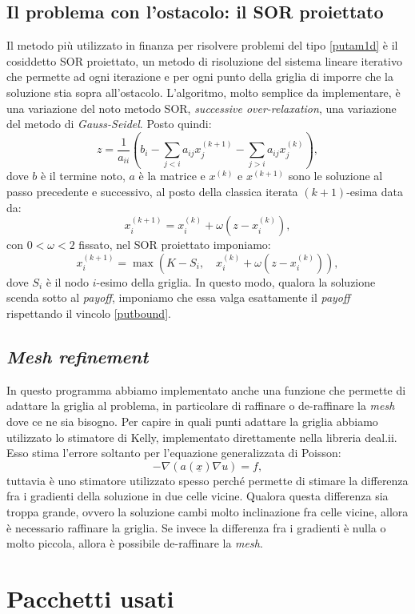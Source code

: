 \documentclass[a4paper,10pt]{report}
\theoremstyle{plain}
\theoremstyle{definition}
\theoremstyle{remark}
\begin{document}
\section{Il problema con l'ostacolo: il SOR proiettato}
Il metodo pi\`u utilizzato in finanza per risolvere problemi del tipo \ref{putam1d}  \`e il cosiddetto SOR proiettato, un metodo di risoluzione del sistema lineare iterativo che permette ad ogni iterazione e per ogni punto della griglia di imporre che la soluzione stia sopra all'ostacolo. L'algoritmo, molto semplice da implementare, \`e una variazione del noto metodo SOR, \emph{successive over-relaxation}, una variazione del metodo di \emph{Gauss-Seidel}. Posto quindi: $$z=\frac{1}{a_{ii}}\left(b_i-\sum_{j<i}a_{ij}x_j^{(k+1)}-\sum_{j>i}a_{ij}x_j^{(k)}\right),$$dove $b$ \`e il termine noto, $a$ \`e la matrice e $x^{(k)}$ e $x^{(k+1)}$ sono le soluzione al passo precedente e successivo, al posto della classica iterata $(k+1)$-esima data da: $$x_i^{(k+1)}=x_i^{(k)}+\omega(z-x_i^{(k)}),$$con $0<\omega<2$ fissato, nel SOR proiettato imponiamo: $$x_i^{(k+1)}=\max\left(K-S_i,\quad x_i^{(k)}+\omega(z-x_i^{(k)})\right),$$dove $S_i$ \`e il nodo $i$-esimo della griglia. In questo modo, qualora la soluzione scenda sotto al \emph{payoff}, imponiamo che essa valga esattamente il \emph{payoff} rispettando il vincolo \ref{putbound}.
\section{\emph{Mesh refinement}}
In questo programma abbiamo implementato anche una funzione che permette di adattare la griglia al problema, in particolare di raffinare o de-raffinare la \emph{mesh} dove ce ne sia bisogno. Per capire in quali punti adattare la griglia abbiamo utilizzato lo stimatore di Kelly, implementato direttamente nella libreria \textsf{deal.ii}. Esso stima l'errore soltanto per l'equazione generalizzata di Poisson: $$-\nabla\left(a(\underline{x})\nabla u\right)=f,$$tuttavia \`e uno stimatore utilizzato spesso perch\'e permette di stimare la differenza fra i gradienti della soluzione in due celle vicine. Qualora questa differenza sia troppa grande, ovvero la soluzione cambi molto inclinazione fra celle vicine, allora \`e necessario raffinare la griglia. Se invece la differenza fra i gradienti \`e nulla o molto piccola, allora \`e possibile de-raffinare la \emph{mesh}.
\chapter{Pacchetti usati}
\end{document}
